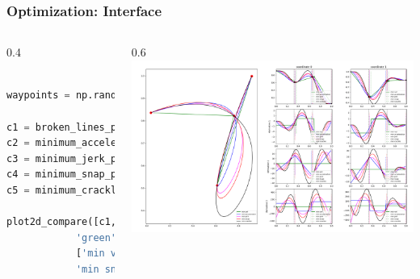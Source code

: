 \begin{frame}[fragile]
	\frametitle{Optimization: Interface}
	\begin{columns}
		\begin{column}{0.4\textwidth}
			\begin{lstlisting}[language=python]

waypoints = np.random.rand(4, 2)

c1 = broken_lines_path(waypoints)
c2 = minimum_acceleration_path(waypoints)
c3 = minimum_jerk_path(waypoints)
c4 = minimum_snap_path(waypoints)
c5 = minimum_crackle_path(waypoints)

plot2d_compare([c1, c2, c3, c4, c5], [
            'green', 'blue', 'magenta', 'red', 'black'],
            ['min vel', 'min acceleration', 'min jerk',
            'min snap', 'min crackle'])

    \end{lstlisting}
		\end{column}
		\begin{column}{0.6\textwidth}
			\includegraphics[width=\textwidth]{./images/comparison.png}
		\end{column}
	\end{columns}

\end{frame}

